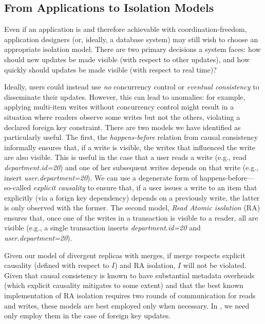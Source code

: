 \subsection{From Applications to Isolation Models}

Even if an application is \iconfluent and therefore achievable with
coordination-freedom, application designers (or, ideally, a database
system) may still wish to choose an appropriate isolation model. There
are two primary decisions a system faces: how should new updates be
made visible (with respect to other updates), and how quickly should
updates be made visible (with respect to real time)?

 Ideally, users could instead use
\textit{no} concurrency control or \textit{eventual consistency} to
disseminate their \iconfluent updates. However, this can lead to
anomalies: for example, applying multi-item writes without concurrency
control might result in a situation where readers observe some writes
but not the others, violating a declared foreign key constraint. There
are two models we have identified as particularly useful. The first,
the \textit{happens-before} relation from causal consistency
informally ensures that, if a write is visible, the writes that
influenced the write are also visible. This is useful in the case that
a user reads a write (e.g., read \textit{department.id=20}) and one of
her subsequent writes depends on that write (e.g., insert
\textit{user.department=20}). We can use a degenerate form of
happens-before---so-called \textit{explicit causality} to ensure that,
if a user issues a write to an item that explicitly (via a forign key
dependency) depends on a previously write, the latter is only observed
with the former. The second model, \textit{Read Atomic isolation} (RA)
ensures that, once one of the writes in a transaction is visible to a
reader, all are visible (e.g., a single transaction inserts
\textit{department.id=20} and \textit{user.department=20}).

Given our \cfree model of divergent replicas with merges, if merge
respects explicit causality (defined with respect to $I$) and RA
isolation, $I$ will not be violated. Given that causal consistency is
known to have substantial metadata overheads (which explicit causality
mitigates to some extent) and that the best known implementation of RA
isolation requires two rounds of communication for reads and writes,
these models are best employed only when necessary. In \lang, we need
only employ them in the case of foreign key updates.

